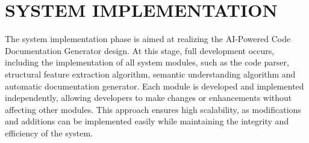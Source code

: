 \chapter{SYSTEM IMPLEMENTATION}
\hspace{0.5cm}
The system implementation phase is aimed at realizing the AI-Powered Code Documentation Generator design. At this stage, full development occurs, including the implementation of all system modules, such as the code parser, structural feature extraction algorithm, semantic understanding algorithm and automatic documentation generator. Each module is developed and implemented independently, allowing developers to make changes or enhancements without affecting other modules. This approach ensures high scalability, as modifications and additions can be implemented easily while maintaining the integrity and efficiency of the system.
